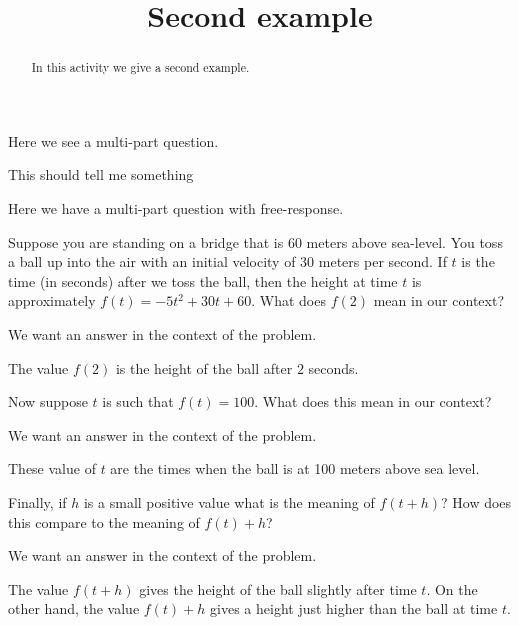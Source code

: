 \documentclass[handout,noinstructornotes]{ximera}
\title{Second example}
\begin{document}
\begin{abstract}
In this activity we give a second example.
\end{abstract} 
\maketitle
\begin{instructorNotes}
  Here we see a multi-part question.
\end{instructorNotes}

\begin{instructorIntro}
  This should tell me something
\end{instructorIntro}

Here we have a multi-part question with free-response.

\begin{question} 
Suppose you are standing on a bridge that is 60 meters above
sea-level. You toss a ball up into the air with an initial velocity of
30 meters per second.  If $t$ is the time (in seconds) after we toss
the ball, then the height at time $t$ is approximately $f(t) = -5 t^2
+30t+60$. What does $f(2)$ mean in our context?
\begin{hint}
We want an answer in the context of the problem. 
\end{hint}
\begin{freeResponse}
The value $f(2)$ is the height of the ball after $2$ seconds.
\end{freeResponse}
Now suppose $t$ is such that $f(t) = 100$. What does this mean in our
context?
\begin{hint}
We want an answer in the context of the problem. 
\end{hint}
\begin{freeResponse}
These value of $t$ are the times when the ball is at 100 meters above sea level.\end{freeResponse}
Finally, if $h$ is a small positive value what is the meaning of
$f(t+h)$? How does this compare to the meaning of $f(t)+h$?
\begin{hint}
We want an answer in the context of the problem. 
\end{hint}
\begin{freeResponse}
The value $f(t+h)$ gives the height of the ball slightly after time
$t$. On the other hand, the value $f(t)+h$ gives a height just higher
than the ball at time $t$.
\end{freeResponse}
\end{question}
\end{document}
